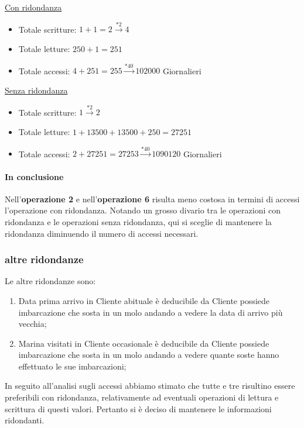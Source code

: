 \underline{Con ridondanza}
\begin{itemize}
    \item Totale scritture: $1 + 1 = 2 \xrightarrow{*2} 4$ 
    \item Totale letture: $250 + 1 = 251$
    \item Totale accessi: $4+251 = 255 \xrightarrow{*40} 102000$ Giornalieri
\end{itemize}
\underline{Senza ridondanza}
\begin{itemize}
    \item Totale scritture: $1 \xrightarrow{*2} 2$ 
    \item Totale letture: $1 + 13500 + 13500 + 250 = 27251$
    \item Totale accessi: $2+27251 = 27253 \xrightarrow{*40} 1090120$ Giornalieri
\end{itemize}

\paragraph{In conclusione}
Nell'\textbf{operazione 2} e nell'\textbf{operazione 6} risulta meno costosa in termini di accessi l'operazione con ridondanza. Notando un grosso divario tra le operazioni con ridondanza e le operazioni senza ridondanza, qui si sceglie di mantenere la ridondanza diminuendo il numero di accessi necessari.

\subsubsection{altre ridondanze}

Le altre ridondanze sono:
\begin{enumerate}
    \item Data prima arrivo in Cliente abituale è deducibile da Cliente possiede imbarcazione che sosta in un molo andando a vedere la data di arrivo più vecchia;
    \item Marina visitati in Cliente occasionale è deducibile da Cliente possiede imbarcazione che sosta in un molo andando a vedere quante soste hanno effettuato le sue imbarcazioni;
\end{enumerate}

In seguito all'analisi sugli accessi abbiamo stimato che tutte e tre risultino essere preferibili con ridondanza, relativamente ad eventuali operazioni di lettura e scrittura di questi valori. Pertanto si è deciso di mantenere le informazioni ridondanti.


